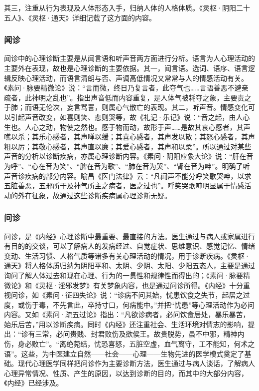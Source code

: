 \documentclass[12pt]{ctexbook}
\begin{document}
其三，注重从行为表现及人体形态入手，归纳人体的人格体质。《灵枢·阴阳二十五人》、《灵枢·通天》详细记载了这方面的内容。

\subsubsection{闻诊}%

闻诊中的心理诊断主要是从闻言语和听声音两方面进行分析。语言为人心理活动的主要外在表现，故也是心理诊断的主要依据。其一，闻言语。选词、语序、语言逻辑反映心理活动，而语言清朗与否、声调高低情况又常常与人的情感活动有关。《素问·脉要精微论》说：“言而微，终日乃复言者，此夺气也……言语善恶不避亲疏者，此神明之乱也”。指出声音低而内容重复，是人体气被耗夺之象，主要责之于肺；而语无伦次，妄言骂詈，则属心气散亡的表现。其二，听声音。情感变化可以引起声音改变，如喜则笑、悲则哭等，故《礼记·乐记》说：“音之起，由人心生也。人心之动，物使之然也。感于物而动，故形于声……是故其哀心感者，其声噍以杀；其乐心感者，其声啴以缓；其喜心感者，其声发以散；其怒心感者，其声粗以厉；其敬心感者，其声直以廉；其爱心感者，其声和以柔”。所以通过对某些声音的分析以诊断疾病，亦属心理诊断内容。《素问·阴阳应象大论》说：“肝在音为呼”、“心在音为笑”、“脾在音为歌”、“肺在音为哭”、“肾在音为呻”。明确了听声音诊疾病的部分内容。喻昌《医门法律》云：“凡闻声不能分呼笑歌哭呻，以求五脏善恶，五邪所干及神气所主之病者，医之过也”。呼笑哭歌呻明显属于情感活动的外在征象，故通过这些诊断疾病属心理诊断无疑。

\subsubsection{问诊}%

问诊，是《内经》心理诊断中最重要、最直接的方法。医生通过与病人或家属进行有目的的交谈，可以了解病人的发病经过、自觉症状、思维意识、感觉记忆、情绪变动、生活习惯、人格气质等诸多有关心理活动的情况，用于诊断疾病。《灵枢·通天》将人格体质归纳为阴阳平和、太阴、少阴、太阳、少阳五态人，主要是通过询问了解人体过去和现在心理、行为的一贯性和规律性而得出的；《素问·脉要精微论》和《灵枢·淫邪发梦》有关梦象内容，也是通过问诊所得。《内经》十分重视问诊，如《素问·征四失论》说：“诊病不问其始，忧患饮食之失节，起居之过度，或伤于毒，不先言此，卒持寸口，何病能中。”并把“忧患”等心理活动作为必问内容。又如《素问·疏五过论》指出：“凡欲诊病者，必问饮食居处，暴乐暴苦，始乐后苦，”用以诊断疾病。同时《内经》还注重社会、生活环境对情志的影响，提出：“诊有三常，必问贵贱、封君败伤及欲侯王。故贵脱势，虽不中邪，精神内伤，身必败亡”。“离绝菀结，忧恐喜怒，五脏空虚，血气离守，工不能知，何术之语”。这些，为中医建立自然——社会——心理——生物先进的医学模式奠定了基础。现代心理医学同样把问诊作为主要诊断方法，医生通过与病人谈话，了解病人心理异常情况、性质、产生的原因，以达到诊断的目的，而其中的大部分内容，《内经》已经涉及。
\end{document}
